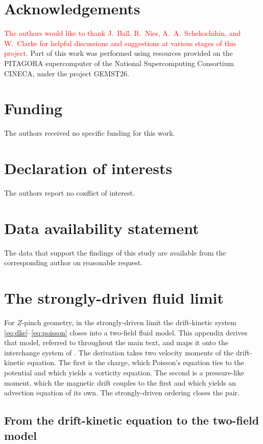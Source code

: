 \documentclass{jpp}
\begin{document}
\section*{Acknowledgements}
\textcolor{red}{The authors would like to thank J.~Ball, R.~Nies, A.~A.~Schekochihin, and W.~Clarke for helpful discussions and suggestions at various stages of this project.} Part of this work was performed using resources provided on the PITAGORA supercomputer of the National Supercomputing Consortium CINECA, under the project GEMST26.

\section*{Funding}
The authors received no specific funding for this work.

\section*{Declaration of interests}
The authors report no conflict of interest.

\section*{Data availability statement}
The data that support the findings of this study are available from the corresponding author on reasonable request.

\appendix
\section{The strongly-driven fluid limit}\label{app:fluid}

For $Z$-pinch geometry, in the strongly-driven limit the drift-kinetic system \cref{eq:dke}--\cref{eq:poisson} closes into a two-field fluid model. This appendix derives that model, referred to throughout the main text, and maps it onto the interchange system of \citet{ClarkeUnpub}. The derivation takes two velocity moments of the drift-kinetic equation. The first is the charge, which Poisson's equation ties to the potential and which yields a vorticity equation. The second is a pressure-like moment, which the magnetic drift couples to the first and which yields an advection equation of its own. The strongly-driven ordering closes the pair.

\subsection{From the drift-kinetic equation to the two-field model}\label{sec:app_fluid_derivation}
\end{document}
